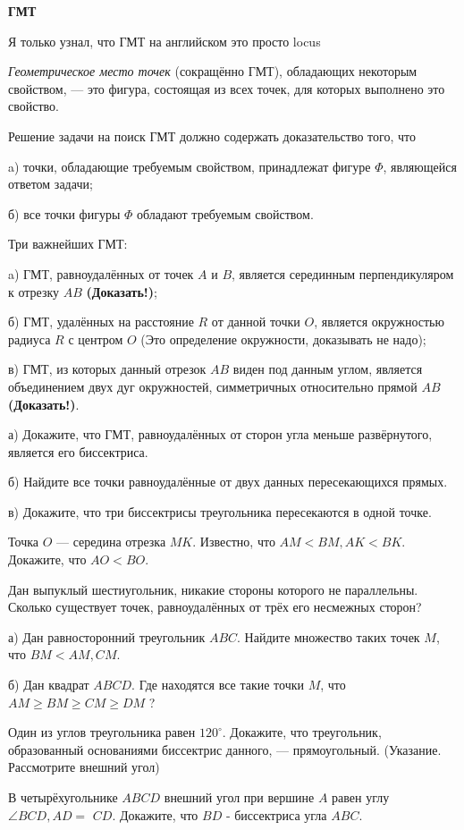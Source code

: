 \centerline{\bf \Huge ГМТ}
\centerline{\bf \Huge }

\begin{flushright}
        \scriptsize{Я только узнал, что ГМТ на английском это просто locus}
\end{flushright}

\textit{Геометрическое место точек} (сокращённо ГМТ), обладающих некоторым свойством, --- это фигура, состоящая из всех точек, для которых выполнено это свойство.

Решение задачи на поиск ГМТ должно содержать доказательство того, что

a) точки, обладающие требуемым свойством, принадлежат фигуре $\Phi$, являющейся ответом задачи;

б) все точки фигуры $\Phi$ обладают требуемым свойством.


Три важнейших ГМТ:

a) ГМТ, равноудалённых от точек $A$ и $B$, является серединным перпендикуляром к отрезку $A B$ \textbf{(Доказать!)};

б) ГМТ, удалённых на расстояние $R$ от данной точки $O$, является окружностью радиуса $R$ с центром $O$ (Это определение окружности, доказывать не надо);

в) ГМТ, из которых данный отрезок $A B$ виден под данным углом, является объединением двух дуг окружностей, симметричных относительно прямой $A B$ \textbf{(Доказать!)}.

а) Докажите, что ГМТ, равноудалённых от сторон угла меньше развёрнутого, является его биссектриса.

\noindent
б) Найдите все точки равноудалённые от двух данных пересекающихся прямых.

\noindent
в) Докажите, что три биссектрисы треугольника пересекаются в одной точке.

Точка $O$ --- середина отрезка $M K$. Известно, что $A M<B M, A K<B K$. Докажите, что $A O<B O$.

Дан выпуклый шестиугольник, никакие стороны которого не параллельны. Сколько существует точек, равноудалённых от трёх его несмежных сторон?

а) Дан равносторонний треугольник $A B C$. Найдите множество таких точек $M$, что $B M<AM, CM$.

\noindent
б) Дан квадрат $A B C D$. Где находятся все такие точки $M$, что $A M \geqslant B M \geqslant C M \geqslant D M$ ?


\newpage

\hspace{3mm}

Один из углов треугольника равен $120^{\circ}$. Докажите, что треугольник, образованный основаниями биссектрис данного, --- прямоугольный. (Указание. Рассмотрите внешний угол)

В четырёхугольнике $A B C D$ внешний угол при вершине $A$ равен углу $\angle B C D, A D=$ $C D$. Докажите, что $B D$ - биссектриса угла $A B C$.